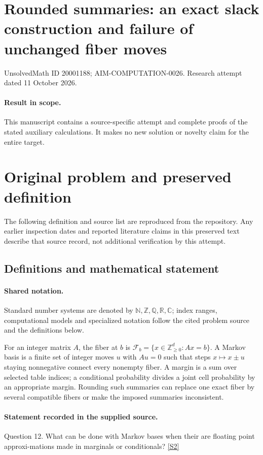 \documentclass[11pt]{article}
\begin{document}
\section*{Rounded summaries: an exact slack construction and failure of unchanged fiber moves}
\noindent UnsolvedMath ID 20001188; AIM-COMPUTATION-0026. Research attempt dated 11 October 2026.
\paragraph{Result in scope.}This manuscript contains a source-specific attempt and complete proofs of the stated auxiliary calculations. It makes no new solution or novelty claim for the entire target.
\section{Original problem and preserved definition}
The following definition and source list are reproduced from the repository. Any earlier inspection dates and reported literature claims in this preserved text describe that source record, not additional verification by this attempt.
\subsection{Definitions and mathematical statement}

\paragraph{Shared notation.}Standard number systems are denoted by $\mathbb N,\mathbb Z,\mathbb Q,\mathbb R,\mathbb C$; index ranges, computational models and specialized notation follow the cited problem source and the definitions below.


For an integer matrix $A$, the fiber at $b$ is $\mathcal F_b=\{x\in\mathbb Z_{\ge0}^d:Ax=b\}$. A Markov basis is a finite set of integer moves $u$ with $Au=0$ such that steps $x\mapsto x\pm u$ staying nonnegative connect every nonempty fiber. A margin is a sum over selected table indices; a conditional probability divides a joint cell probability by an appropriate margin. Rounding such summaries can replace one exact fiber by several compatible fibers or make the imposed summaries inconsistent.
\paragraph{Statement recorded in the supplied source.}
Question 12. What can be done with Markov bases when their are floating point approxi-mations made in marginals or conditionals? \href{https://aimath.org/WWN/compalgstat/compalgstat.pdf}{[S2]}
\end{document}
